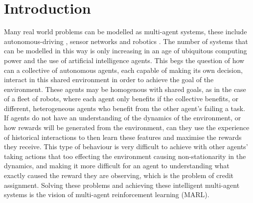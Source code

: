 \documentclass{article}
\begin{document}
\newpage

\tableofcontents

\newpage

\section{Introduction}

Many real world problems can be modelled as multi-agent systems, these include autonomous-driving \citep{shavlev2016safe}, sensor networks \citep{vinyals2014sensor} and robotics \citep{kober2013reinforcement}. The number of systems that can be modelled in this way is only increasing in an age of ubiquitous computing power and the use of artificial intelligence agents. This begs the question of how can a collective of autonomous agents, each capable of making its own decision, interact in this shared environment in order to achieve the goal of the environment. These agents may be homogenous with shared goals, as in the case of a fleet of robots, where each agent only benefits if the collective benefits, or different, heterogeneous agents who benefit from the other agent's failing a task. If agents do not have an understanding of the dynamics of the environment, or how rewards will be generated from the environment, can they use the experience of historical interactions to then learn these features and maximise the rewards they receive. This type of behaviour is very difficult to achieve with other agents' taking actions that too effecting the environment causing non-stationarity in the dynamics, and making it more difficult for an agent to understanding what exactly caused the reward they are observing, which is the problem of credit assignment. Solving these problems and achieving these intelligent multi-agent systems is the vision of multi-agent reinforcement learning (MARL). \citep{albrecht2024marl}

\
\end{document}
